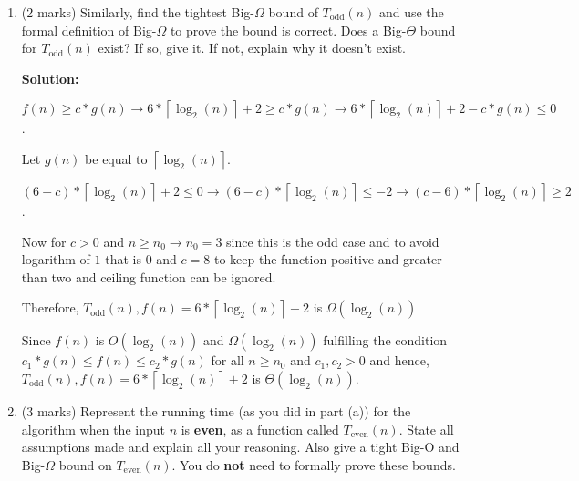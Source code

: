 \documentclass[a4,13pt]{extarticle}
\newenvironment{Solution}{\color{blue}\textbf{Solution:}}{}
\begin{document}
\begin{enumerate}
\begin{enumerate}
\begin{Solution}
	      	      \end{Solution}
	      	      	      	                  
	      	\item (2 marks) Similarly, find the tightest Big-$\Omega$ bound of $T_{\text{odd}}(n)$ and use the formal definition of Big-$\Omega$ to prove the bound is correct. Does a Big-$\Theta$ bound for $T_{\text{odd}}(n)$ exist? If so, give it. If not, explain why it doesn't exist.
	      	
	      	\begin{Solution}
	      	\def \runTime {6*\left \lceil{\log_2(n)}\right \rceil+2}

	      	       
	      	       $f(n) \geq c*g(n) \rightarrow \runTime{} \geq c*g(n) \rightarrow \runTime{} - c*g(n) \le 0$.
	      	       
	                Let $g(n)$ be equal to $\left \lceil{\log_2(n)}\right \rceil$. 
	                
	               $ (6 - c) * \left \lceil{\log_2(n)}\right \rceil + 2\le 0 \rightarrow (6 - c) * \left \lceil{\log_2(n)}\right \rceil \le -2 \rightarrow (c - 6) * \left \lceil{\log_2(n)}\right \rceil \geq 2 $.
	               
	               Now for $c > 0$ and $n \geq n_{\text{0}} \rightarrow n_{\text{0}} = 3$ since this is the odd case and to avoid logarithm of $1$ that is $0$ and $c = 8$ to keep the function positive and greater than two and ceiling function can be ignored.
	               
	               Therefore, $T_{\text{odd}}(n), f(n) = \runTime{}$ is $\Omega(\log_2(n))$
	               
	               Since $f(n)$ is $O(\log_2(n))$ and $\Omega(\log_2(n))$ fulfilling the condition $c_{\text{1}}*g(n) \le f(n) \le c_{\text{2}} * g(n)$ for all $n \geq n_{\text{0}}$ and $c_{\text{1}},c_{\text{2}} > 0$ and hence, $T_{\text{odd}}(n), f(n) = \runTime{}$ is $\Theta(\log_2(n))$.
	      	       
	      	\end{Solution}
	      	      	      	                  
	      	      	      	                  
	      	\item (3 marks) Represent the running time (as you did in part (a)) for the algorithm when the input $n$ is \textbf{even}, as a function called $T_{\text{even}}(n)$. State all assumptions made and explain all your reasoning. Also give a tight Big-O and Big-$\Omega$ bound on $T_{\text{even}}(n)$. You do \textbf{not} need to formally prove these bounds.
	      	

\end{enumerate}
\end{enumerate}
\end{document}
